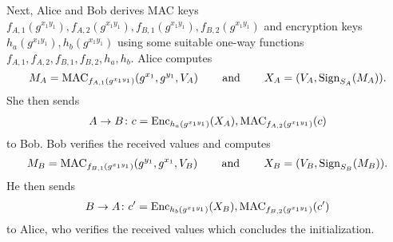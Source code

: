 \begin{protocol}
  Next, Alice and Bob derives \ac{MAC} keys \(f_{A,1}( g^{x_1 y_1} ), f_{A,2}( 
    g^{x_1 y_1} ), f_{B,1}( g^{x_1 y_1} ), f_{B,2}( g^{x_1 y_1} )\) and 
  encryption keys \(h_a( g^{x_1 y_1} ), h_b( g^{x_1 y_1} )\) using some 
  suitable one-way functions \(f_{A,1}, f_{A,2}, f_{B,1}, f_{B,2}, h_a, h_b\).
  Alice computes \[M_A = \operatorname{\mathrm{MAC}}_{f_{A,1}(g^{x_1 y_1})}( g^{x_1}, g^{y_1}, V_A 
  )\operatorname{\qquad and\qquad} X_A = ( V_A, \operatorname{\mathrm{Sign}}_{S_A}( M_A ) ).\]
  She then sends
  \begin{align*}
    A\to B\colon c = \operatorname{\mathrm{Enc}}_{h_a(g^{x_1 y_1})}( X_A ), \operatorname{\mathrm{MAC}}_{f_{A,2}(g^{x_1 
        y_1})}( c )
  \end{align*}
  to Bob.
  Bob verifies the received values and computes \[%
    M_B = \MAC_{f_{B,1}(g^{x_1 y_1})}( g^{y_1}, g^{x_1}, V_B )\textand X_B 
    = ( V_B, \Sign_{S_B}( M_B ) ).
  \]
  He then sends
  \begin{align*}
    B\to A\colon c^\prime = \operatorname{\mathrm{Enc}}_{h_b(g^{x_1 y_1})}( X_B ), 
    \operatorname{\mathrm{MAC}}_{f_{B,2}(g^{x_1 y_1})}( c^\prime )
  \end{align*}
  to Alice, who verifies the received values which concludes the 
  initialization.
\end{protocol}

